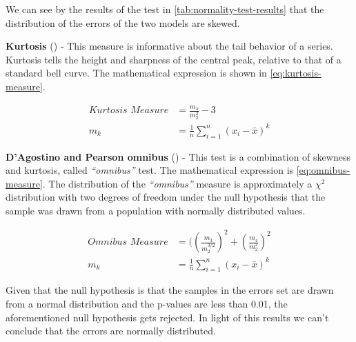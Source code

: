 We can see by the results of the test in
\autoref{tab:normality-test-results} that the distribution of the
errors of the two models are skewed. 

\textbf{Kurtosis} (\cite{anscombe1983distribution}) - This measure is
informative about the tail behavior of a series. Kurtosis tells the
height and sharpness of the central peak, relative to that of a
standard bell curve. The mathematical expression is shown
in \autoref{eq:kurtosis-measure}.

\begin{equation}
  \begin{aligned}
    \label{eq:kurtosis-measure}
    \textit{Kurtosis Measure} & =
    \frac{m_4}{m_2^2} - 3 \\
      m_k & = \frac{1}{n} \displaystyle\sum_{i=1}^n (x_i - \bar{x} )^k
  \end{aligned}
\end{equation}

\textbf{D’Agostino and Pearson omnibus} (\cite{d1971omnibus,
  d1973tests}) - This test is a combination of skewness and kurtosis,
called \textit{``omnibus''} test. The mathematical expression is
\autoref{eq:omnibus-measure}. The distribution of the
\textit{``omnibus''} measure  is approximately a $\chi^2$ distribution
with two degrees of freedom under the null hypothesis that the sample
was drawn from a population with normally distributed values.

\begin{equation}
  \begin{aligned}
    \label{eq:omnibus-measure}
    \textit{Omnibus Measure} & =
    ((\frac{m_3}{m_2^{3/2}})^2 + (\frac{m_4}{m_2^2})^2\\
    m_k & = \frac{1}{n} \displaystyle\sum_{i=1}^n (x_i - \bar{x} )^k
  \end{aligned}
\end{equation}

Given that the null hypothesis is that the samples in the errors set
are drawn from a normal distribution and the p-values are less than
0.01, the aforementioned null hypothesis gets rejected. In light of
this results we can't conclude that the errors are normally
distributed.




